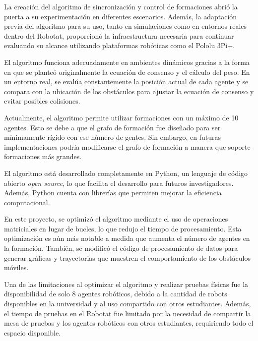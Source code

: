 La creación del algoritmo de sincronización y control de formaciones abrió la puerta a su experimentación en diferentes escenarios. Además, la adaptación previa del algoritmo para su uso, tanto en simulaciones como en entornos reales dentro del Robotat, proporcionó la infraestructura necesaria para continuar evaluando su alcance utilizando plataformas robóticas como el Pololu 3Pi+. 

El algoritmo funciona adecuadamente en ambientes dinámicos gracias a la forma en que se planteó originalmente la ecuación de consenso y el cálculo del peso. En un entorno real, se evalúa constantemente la posición actual de cada agente y se compara con la ubicación de los obstáculos para ajustar la ecuación de consenso y evitar posibles colisiones.

Actualmente, el algoritmo permite utilizar formaciones con un máximo de 10 agentes. Esto se debe a que el grafo de formación fue diseñado para ser mínimamente rígido con ese número de gentes. Sin embargo, en futuras implementaciones podría modificarse el grafo de formación a manera que soporte formaciones más grandes.

El algoritmo está desarrollado completamente en Python, un lenguaje de código abierto \textit{open source}, lo que facilita el desarrollo para futuros investigadores. Además, Python cuenta con librerías que permiten mejorar la eficiencia computacional.

En este proyecto, se optimizó el algoritmo mediante el uso de operaciones matriciales en lugar de bucles, lo que redujo el tiempo de procesamiento. Esta optimización es aún más notable a medida que aumenta el número de agentes en la formación. También, se modificó el código de procesamiento de datos para generar gráficas y trayectorias que muestren el comportamiento de los obstáculos móviles.

Una de las limitaciones al optimizar el algoritmo y realizar pruebas físicas fue la disponibilidad de solo 8 agentes robóticos, debido a la cantidad de robots disponibles en la universidad y al uso compartido con otros estudiantes. Además, el tiempo de pruebas en el Robotat fue limitado por la necesidad de compartir la mesa de pruebas y los agentes robóticos con otros estudiantes, requiriendo todo el espacio disponible.

